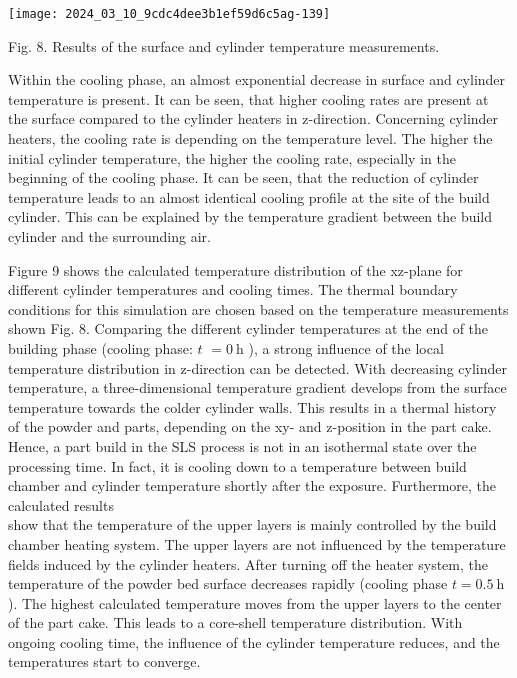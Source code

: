 \documentclass[10pt]{article}
\begin{document}
\begin{center}
\texttt{[image: 2024\_03\_10\_9cdc4dee3b1ef59d6c5ag-139]}
\end{center}

Fig. 8. Results of the surface and cylinder temperature measurements.

Within the cooling phase, an almost exponential decrease in surface and cylinder temperature is present. It can be seen, that higher cooling rates are present at the surface compared to the cylinder heaters in z-direction. Concerning cylinder heaters, the cooling rate is depending on the temperature level. The higher the initial cylinder temperature, the higher the cooling rate, especially in the beginning of the cooling phase. It can be seen, that the reduction of cylinder temperature leads to an almost identical cooling profile at the site of the build cylinder. This can be explained by the temperature gradient between the build cylinder and the surrounding air.

Figure 9 shows the calculated temperature distribution of the xz-plane for different cylinder temperatures and cooling times. The thermal boundary conditions for this simulation are chosen based on the temperature measurements shown Fig. 8. Comparing the different cylinder temperatures at the end of the building phase (cooling phase: $t$ $=0 \mathrm{~h}$ ), a strong influence of the local temperature distribution in z-direction can be detected. With decreasing cylinder temperature, a three-dimensional temperature gradient develops from the surface temperature towards the colder cylinder walls. This results in a thermal history of the powder and parts, depending on the xy- and z-position in the part cake. Hence, a part build in the SLS process is not in an isothermal state over the processing time. In fact, it is cooling down to a temperature between build chamber and cylinder temperature shortly after the exposure. Furthermore, the calculated results\\
show that the temperature of the upper layers is mainly controlled by the build chamber heating system. The upper layers are not influenced by the temperature fields induced by the cylinder heaters. After turning off the heater system, the temperature of the powder bed surface decreases rapidly (cooling phase $t=0.5 \mathrm{~h}$ ). The highest calculated temperature moves from the upper layers to the center of the part cake. This leads to a core-shell temperature distribution. With ongoing cooling time, the influence of the cylinder temperature reduces, and the temperatures start to converge.
\end{document}
